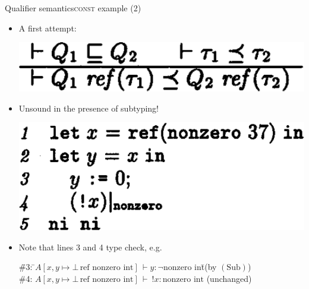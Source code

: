 \documentclass{beamer}
\begin{document}
\begin{frame}{Qualifier semantics}{\textsc{const} example (2)}
  \begin{itemize}
  \item A first attempt:
    \begin{center}
    \includegraphics[scale=0.29]{paper_ref_unsound.png}
    \end{center}
  \item<2-> Unsound in the presence of subtyping!
    \begin{center}
    \includegraphics[scale=0.3]{paper_ref_unsoundsample.png}
    \end{center}
  \item<3->[$\Rightarrow$] Note that lines 3 and 4 type check, e.g.\
    \begin{minipage}[t]{0.3\textwidth}
    \begin{tabbing}
    \=\#3: \=$A[x, y \mapsto \bot\,\text{ref nonzero int}]\,\vdash y : \neg\text{nonzero int}$\quad \=\small(by $(\text{Sub})$)\\
    \>\#4: \>$A[x, y \mapsto \bot\,\text{ref nonzero int}]\,\vdash\ !x : \text{nonzero int}$ \>\small(unchanged)
    \end{tabbing}
    \end{minipage}
  \end{itemize}
\end{frame}
\end{document}
